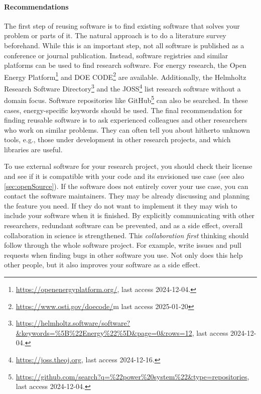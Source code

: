 \paragraph{Recommendations} The first step of reusing software is to find existing software that solves your problem or parts of it. The natural approach is to do a literature survey beforehand. While this is an important step, not all software is published as a conference or journal publication. Instead, software registries and similar platforms can be used to find research software. For energy research,  the Open Energy Platform\footnote{\label{fn:oep}\url{https://openenergyplatform.org/}, last access 2024-12-04.} and DOE CODE\footnote{\url{https://www.osti.gov/doecode/}m last access 2025-01-20} are available. Additionally, the Helmholtz Research Software Directory\footnote{\url{https://helmholtz.software/software?&keywords=\%5B\%22Energy\%22\%5D\&page=0\&rows=12}, last access 2024-12-04.} and the \ac{JOSS}\footnote{\label{fn:joss}\url{https://joss.theoj.org}, last access 2024-12-16.} list research software without a domain focus. 
Software repositories like GitHub\footnote{\url{https://github.com/search?q=\%22power\%20system\%22\&type=repositories}, last access 2024-12-04.} can also be searched. In these cases, energy-specific keywords should be used.
The final recommendation for finding reusable software is to ask experienced colleagues and other researchers who work on similar problems. They can often tell you about hitherto unknown tools, e.g., those under development in other research projects, and which libraries are useful.
\par 
To use external software for your research project, you should check their license and see if it is compatible with your code and its envisioned use case (see also \ref{sec:openSource}). 
If the software does not entirely cover your use case, you can contact the software maintainers. They may be already discussing and planning the feature you need. If they do not want to implement it they may wish to include your software when it is finished. By explicitly communicating with other researchers, redundant software can be prevented, and as a side effect, overall collaboration in science is strengthened. This \textit{collaboration first} thinking should follow through the whole software project. For example, write issues and pull requests when finding bugs in other software you use. Not only does this help other people, but it also improves your software as a side effect.

